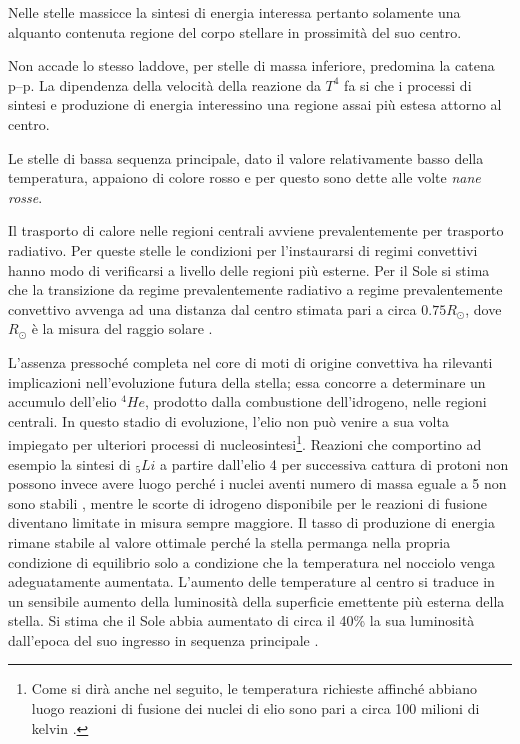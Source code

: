 Nelle stelle massicce la sintesi di energia interessa pertanto solamente una alquanto contenuta regione del corpo stellare in prossimit\`{a} del suo centro.
\par
Non accade lo stesso laddove, per stelle di massa inferiore, predomina la catena p--p. La dipendenza della velocit\`{a} della reazione da $T^{4}$ fa si che i processi di sintesi e produzione di energia interessino una regione assai più estesa attorno al centro.
\par

\smallskip

Le stelle di bassa sequenza principale, dato il valore relativamente basso della temperatura, appaiono di colore rosso e per questo sono dette alle volte \emph{nane rosse}.
\par
Il trasporto di calore nelle regioni centrali avviene prevalentemente per trasporto radiativo.
Per queste stelle le condizioni per l'instaurarsi di regimi convettivi hanno modo di verificarsi a livello delle regioni più esterne. Per il Sole si stima che la transizione da regime prevalentemente radiativo a regime prevalentemente convettivo avvenga ad una distanza dal centro stimata pari a circa $0.75R_{\odot}$, dove $R_{\odot}$ è la misura del raggio solare \Cite{collins}.
\par
L'assenza pressoché completa nel core di moti di origine convettiva ha rilevanti implicazioni nell'evoluzione futura della stella; essa concorre a determinare un accumulo dell'elio $^{4}He$, prodotto dalla combustione dell'idrogeno, nelle regioni centrali.
In questo stadio di evoluzione, l'elio non può venire a sua volta impiegato per ulteriori processi di nucleosintesi\footnote{Come si dir\`{a} anche nel seguito, le temperatura richieste affinché abbiano luogo reazioni di fusione dei nuclei di elio sono pari a circa 100 milioni di kelvin \Cite{kittel}.}. Reazioni che comportino ad esempio la sintesi di $_{5}Li$ a partire dall'elio 4 per successiva cattura di protoni non possono invece avere luogo perch\'{e} i nuclei aventi numero di massa eguale a 5 non sono stabili \Cite{rosino}, mentre le scorte di idrogeno disponibile per le reazioni di fusione diventano limitate in misura sempre maggiore.
Il tasso di produzione di energia rimane stabile al valore ottimale perch\'{e} la stella permanga nella propria condizione di equilibrio solo a condizione che la temperatura nel nocciolo venga adeguatamente aumentata. L'aumento delle temperature al centro si traduce in un sensibile aumento della luminosit\`{a} della superficie emettente più esterna della stella. Si stima che il Sole abbia aumentato di circa il 40\% la sua luminosit\`{a} dall'epoca del suo ingresso in sequenza principale \Cite{collins}.
